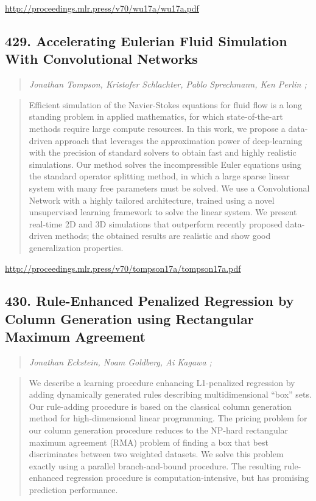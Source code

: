 \documentclass{article}
\begin{document}
\href{http://proceedings.mlr.press/v70/wu17a/wu17a.pdf}{http://proceedings.mlr.press/v70/wu17a/wu17a.pdf}

\subsection{429. Accelerating Eulerian Fluid Simulation With Convolutional Networks}

\begin{quote}
\footnotesize{\textit{Jonathan Tompson, Kristofer Schlachter, Pablo Sprechmann, Ken Perlin ;}}
\end{quote}

\begin{quote}
    Efficient simulation of the Navier-Stokes equations for fluid flow is a long standing problem in applied mathematics, for which state-of-the-art methods require large compute resources. In this work, we propose a data-driven approach that leverages the approximation power of deep-learning with the precision of standard solvers to obtain fast and highly realistic simulations. Our method solves the incompressible Euler equations using the standard operator splitting method, in which a large sparse linear system with many free parameters must be solved. We use a Convolutional Network with a highly tailored architecture, trained using a novel unsupervised learning framework to solve the linear system. We present real-time 2D and 3D simulations that outperform recently proposed data-driven methods; the obtained results are realistic and show good generalization properties.  \end{quote}

\href{http://proceedings.mlr.press/v70/tompson17a/tompson17a.pdf}{http://proceedings.mlr.press/v70/tompson17a/tompson17a.pdf}

\subsection{430. Rule-Enhanced Penalized Regression by Column Generation using Rectangular Maximum Agreement}

\begin{quote}
\footnotesize{\textit{Jonathan Eckstein, Noam Goldberg, Ai Kagawa ;}}
\end{quote}

\begin{quote}
    We describe a learning procedure enhancing L1-penalized regression by adding dynamically generated rules describing multidimensional “box” sets. Our rule-adding procedure is based on the classical column generation method for high-dimensional linear programming. The pricing problem for our column generation procedure reduces to the NP-hard rectangular maximum agreement (RMA) problem of finding a box that best discriminates between two weighted datasets. We solve this problem exactly using a parallel branch-and-bound procedure. The resulting rule-enhanced regression procedure is computation-intensive, but has promising prediction performance.  \end{quote}
\end{document}
